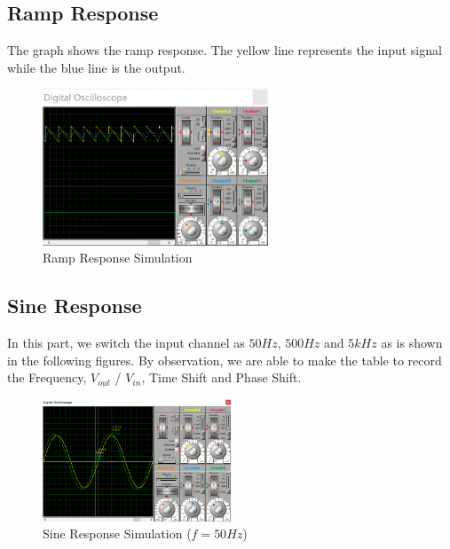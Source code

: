 \documentclass [utf8] {article}
\begin{document}
{{    }

    \subsection{Ramp Response}
    {
        The graph shows the ramp response. The yellow line represents the input signal while the blue line is the output.
        \begin{figure}[H]
            \begin{small}
                \begin{center}
                    \includegraphics[width=0.6\textwidth]{figures/Figure5.png}
                \end{center}
                \caption{Ramp Response Simulation}
                \label{fig:fig4}
            \end{small}
        \end{figure}
        
    }

    \subsection{Sine Response}
    {
        In this part, we switch the input channel as $50Hz$, $500Hz$ and $5kHz$ as is shown in the following figures. By observation, we are able to make the table to record the Frequency, $V_{out}$ / $V_{in}$, Time Shift and Phase Shift.
        \begin{figure}[H]
            \begin{small}
                \begin{center}
                    \includegraphics[width=0.5\textwidth]{figures/Figure6.png}
                \end{center}
                \caption{Sine Response Simulation ($f = 50Hz$)}
                \label{fig:fig5}
            \end{small}
        \end{figure}

}}
\end{document}
